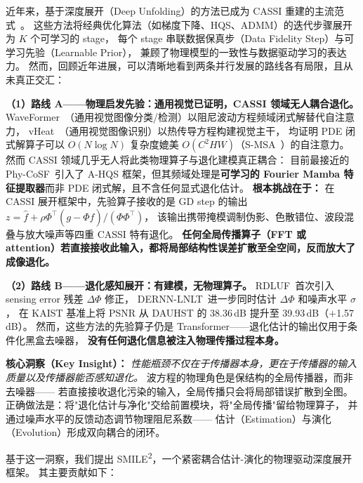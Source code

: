 \documentclass[a4paper,11pt,twocolumn]{ctexart}
\newcommand{\smiletwo}{SMILE\textsuperscript{2}}
\begin{document}
近年来，基于深度展开（Deep Unfolding）的方法已成为 CASSI 重建的主流范式~\citep{cai2022mst,cai2022dauhst,zhang2024dpu,zhang2024ssr}。
这些方法将经典优化算法（如梯度下降、HQS、ADMM）的迭代步骤展开为 $K$ 个可学习的 stage，
每个 stage 串联数据保真步（Data Fidelity Step）与可学习先验（Learnable Prior），
兼顾了物理模型的一致性与数据驱动学习的表达力。
然而，回顾近年进展，可以清晰地看到两条并行发展的路线各有局限，且从未真正交汇：

\textbf{（1）路线 A——物理启发先验：通用视觉已证明，CASSI 领域无人耦合退化。}
WaveFormer~\citep{shu2026waveformer}（通用视觉图像分类/检测）以阻尼波动方程频域闭式解替代自注意力，
vHeat~\citep{wang2024vheat}（通用视觉图像识别）以热传导方程构建视觉主干，
均证明 PDE 闭式解算子可以 $O(N\log N)$ 复杂度媲美 $O(C^2HW)$（S-MSA~\citep{cai2022mst}）的自注意力。
然而 CASSI 领域几乎无人将此类物理算子与退化建模真正耦合：
目前最接近的 Phy-CoSF~\citep{chen2026phycosf}引入了 A-HQS 框架，但其频域处理是\textbf{可学习的 Fourier Mamba 特征提取器}而非 PDE 闭式解，且不含任何显式退化估计。
\textbf{根本挑战在于：}
在 CASSI 展开框架中，先验算子接收的是 GD step 的输出
$z = \hat{f} + \rho\Phi^\top(g - \Phi\hat{f})/(\Phi\Phi^\top)$，
该输出携带掩模调制伪影、色散错位、波段混叠与放大噪声等四重 CASSI 特有退化。
\textbf{任何全局传播算子（FFT 或 attention）若直接接收此输入，都将局部结构性误差扩散至全空间，反而放大了成像退化。}

\textbf{（2）路线 B——退化感知展开：有建模，无物理算子。}
RDLUF~\citep{dong2023rdluf}首次引入 sensing error 残差 $\Delta\Phi$ 修正，
DERNN-LNLT~\citep{dong2024dernnlnlt}进一步同时估计 $\Delta\Phi$ 和噪声水平 $\sigma$，
在 KAIST 基准上将 PSNR 从 DAUHST 的 38.36\,dB 提升至 39.93\,dB（$+$1.57\,dB）。
然而，这些方法的先验算子仍是 Transformer——退化估计的输出仅用于条件化黑盒去噪器，
\textbf{没有任何退化信息被注入物理传播过程本身。}

\textbf{核心洞察（Key Insight）：}
\emph{性能瓶颈不仅在于传播器本身，更在于传播器的输入质量以及传播器能否感知退化。}
波方程的物理角色是保结构的全局传播器，而非去噪器——
若直接接收退化污染的输入，全局传播只会将局部错误扩散到全图。
正确做法是：将"退化估计与净化"交给前置模块，将"全局传播"留给物理算子，
并通过噪声水平的反馈动态调节物理阻尼系数——
估计（Estimation）与演化（Evolution）形成双向耦合的闭环。

基于这一洞察，我们提出 \smiletwo{}，一个紧密耦合估计-演化的物理驱动深度展开框架。
其主要贡献如下：
\end{document}
